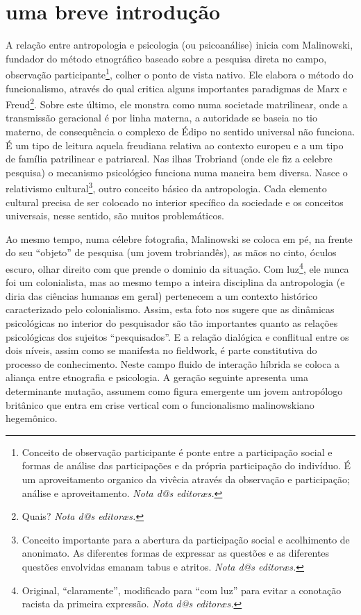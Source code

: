 \documentclass[a4paper, 12pt]{article} %
\makeatletter
\newcommand{\ftnt}[1]{\footnote{#1 \emph{Nota d@s editoræs.}}}
\makeatother
\begin{document}
\section*{uma breve introdução}\label{sec:start}
A relação entre antropologia e psicologia (ou psicoanálise) inicia com Malinowski, fundador do método etnográfico baseado sobre a pesquisa direta no campo, observação participante\ftnt{Conceito de observação participante é ponte entre a participação social e formas de análise das participações e da própria participação do indivíduo. É um aproveitamento organico da vivêcia através da observação e participação; análise e aproveitamento.}, colher o ponto de vista nativo. Ele elabora o método do funcionalismo, através  do qual critica alguns importantes paradigmas de Marx e Freud\ftnt{Quais?}. Sobre este último, ele monstra como numa societade matrilinear, onde a transmissão geracional é  por linha materna,  a autoridade se baseia no tio materno, de consequência o complexo de Édipo no sentido universal não funciona. É  um tipo de leitura aquela freudiana relativa ao contexto europeu e a um tipo de família patrilinear e patriarcal. Nas ilhas Trobriand (onde ele fiz a celebre pesquisa) o mecanismo psicológico funciona numa maneira bem diversa. Nasce o relativismo cultural\ftnt{Conceito importante para a abertura da participação social e acolhimento de anonimato. As diferentes formas de expressar as questões e as diferentes questões envolvidas emanam tabus e atritos.}, outro conceito básico da antropologia. Cada elemento cultural precisa de ser colocado no interior specífico da sociedade e os conceitos universais, nesse sentido, são muitos problemáticos. 

Ao mesmo tempo, numa célebre fotografia, Malinowski se coloca em pé, na frente do seu “objeto” de pesquisa (um jovem trobriandês), as mãos no cinto, óculos escuro, olhar direito com que prende o dominio da situação. Com luz\ftnt{Original, ``claramente'', modificado para ``com luz'' para evitar a conotação racista da primeira expressão.}, ele nunca foi um colonialista, mas ao mesmo tempo a inteira disciplina da antropologia (e diria das ciências humanas em geral) pertenecem a um contexto histórico caracterizado pelo colonialismo. Assim, esta foto nos sugere que as dinâmicas psicológicas no interior do pesquisador são tão importantes  quanto as relações psicológicas dos sujeitos “pesquisados”. E a relação dialógica e conflitual entre os dois níveis, assim como se manifesta no fieldwork, é  parte constitutiva do processo de conhecimento. Neste campo fluido de interação híbrida se coloca a aliança entre etnografia e psicologia. A geração seguinte apresenta uma determinante mutação, assumem como figura emergente um jovem antropólogo britânico que entra em crise vertical com o funcionalismo malinowskiano hegemônico.
\end{document}
